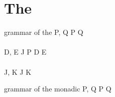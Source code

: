 \section{The \JoinCalc}

\begin{definition}{grammar of the \joincalc}
  P, Q
  \grmr {}
  \altn {}
  \altn P \jpar Q
  \altn \jnullproc
  \\ \\
  D, E
  \grmr J \jrct P
  \altn D \jcon E
  \altn \jnulldef
  \\ \\
  J, K
  \grmr {}
  \altn J \jpat K
\end{definition}

\begin{definition}{grammar of the monadic \joincalc}
  P, Q
  \grmr {}
  \altn P \jpar Q
  \altn {}
\end{definition}

